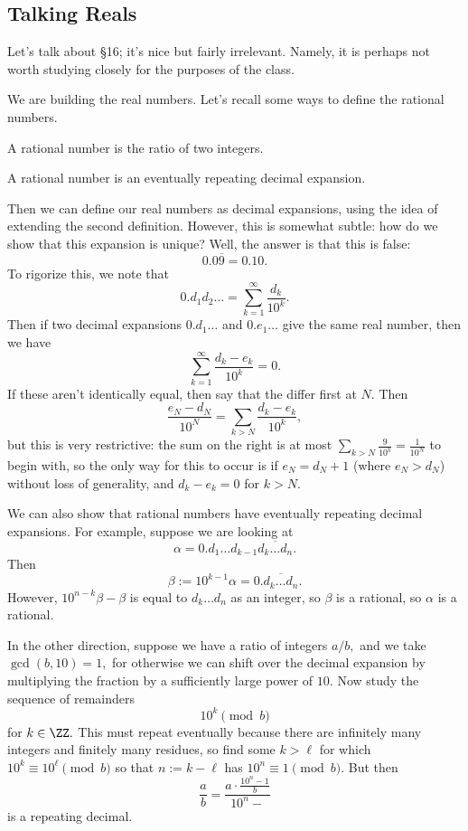 \subsection{Talking Reals}
Let's talk about \S16; it's nice but fairly irrelevant. Namely, it is perhaps not worth studying closely for the purposes of the class.

We are building the real numbers. Let's recall some ways to define the rational numbers.
\begin{definition}
	A rational number is the ratio of two integers.
\end{definition}
\begin{definition}
	A rational number is an eventually repeating decimal expansion.
\end{definition}
Then we can define our real numbers as decimal expansions, using the idea of extending the second definition. However, this is somewhat subtle: how do we show that this expansion is unique? Well, the answer is that this is false:
\[0.0\overline9=0.10.\]
To rigorize this, we note that
\[0.d_1d_2\ldots=\sum_{k=1}^\infty\frac{d_k}{10^k}.\]
Then if two decimal expansions $0.d_1\ldots$ and $0.e_1\ldots$ give the same real number, then we have
\[\sum_{k=1}^\infty\frac{d_k-e_k}{10^k}=0.\]
If these aren't identically equal, then say that the differ first at $N.$ Then
\[\frac{e_N-d_N}{10^N}=\sum_{k>N}\frac{d_k-e_k}{10^k},\]
but this is very restrictive: the sum on the right is at most $\sum_{k>N}\frac9{10^k}=\frac1{10^N}$ to begin with, so the only way for this to occur is if $e_N=d_N+1$ (where $e_N>d_N$) without loss of generality, and $d_k-e_k=0$ for $k>N.$

We can also show that rational numbers have eventually repeating decimal expansions. For example, suppose we are looking at
\[\alpha=0.d_1\ldots d_{k-1}\overline{d_k\ldots d_n}.\]
Then
\[\beta:=10^{k-1}\alpha=0.\overline{d_k\ldots d_n}.\]
However, $10^{n-k}\beta-\beta$ is equal to $d_k\ldots d_n$ as an integer, so $\beta$ is a rational, so $\alpha$ is a rational.

In the other direction, suppose we have a ratio of integers $a/b,$ and we take $\gcd(b,10)=1,$ for otherwise we can shift over the decimal expansion by multiplying the fraction by a sufficiently large power of $10.$ Now study the sequence of remainders
\[10^k\pmod b\]
for $k\in\ZZ.$ This must repeat eventually because there are infinitely many integers and finitely many residues, so find some $k>\ell$ for which $10^k\equiv10^\ell\pmod b$ so that $n:=k-\ell$ has $10^n\equiv1\pmod b.$ But then
\[\frac ab=\frac{a\cdot\frac{10^n-1}b}{10^n-}\]
is a repeating decimal.

